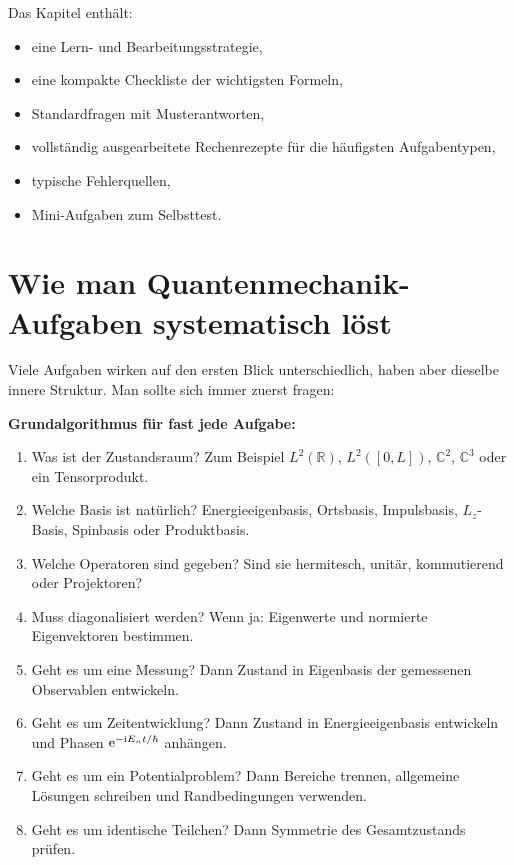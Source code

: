 Das Kapitel enthält:
\begin{itemize}
    \item eine Lern- und Bearbeitungsstrategie,
    \item eine kompakte Checkliste der wichtigsten Formeln,
    \item Standardfragen mit Musterantworten,
    \item vollständig ausgearbeitete Rechenrezepte für die häufigsten Aufgabentypen,
    \item typische Fehlerquellen,
    \item Mini-Aufgaben zum Selbsttest.
\end{itemize}

\section{Wie man Quantenmechanik-Aufgaben systematisch löst}

Viele Aufgaben wirken auf den ersten Blick unterschiedlich, haben aber dieselbe innere Struktur. Man sollte sich immer zuerst fragen:

\begin{examtipbox}
\textbf{Grundalgorithmus für fast jede Aufgabe:}
\begin{enumerate}
    \item Was ist der Zustandsraum? Zum Beispiel $L^2(\mathbb R)$, $L^2([0,L])$, $\mathbb C^2$, $\mathbb C^3$ oder ein Tensorprodukt.
    \item Welche Basis ist natürlich? Energieeigenbasis, Ortsbasis, Impulsbasis, $L_z$-Basis, Spinbasis oder Produktbasis.
    \item Welche Operatoren sind gegeben? Sind sie hermitesch, unitär, kommutierend oder Projektoren?
    \item Muss diagonalisiert werden? Wenn ja: Eigenwerte und normierte Eigenvektoren bestimmen.
    \item Geht es um eine Messung? Dann Zustand in Eigenbasis der gemessenen Observablen entwickeln.
    \item Geht es um Zeitentwicklung? Dann Zustand in Energieeigenbasis entwickeln und Phasen $\mathrm{e}^{-\mathrm{i} E_nt/\hbar}$ anhängen.
    \item Geht es um ein Potentialproblem? Dann Bereiche trennen, allgemeine Lösungen schreiben und Randbedingungen verwenden.
    \item Geht es um identische Teilchen? Dann Symmetrie des Gesamtzustands prüfen.
\end{enumerate}
\end{examtipbox}

